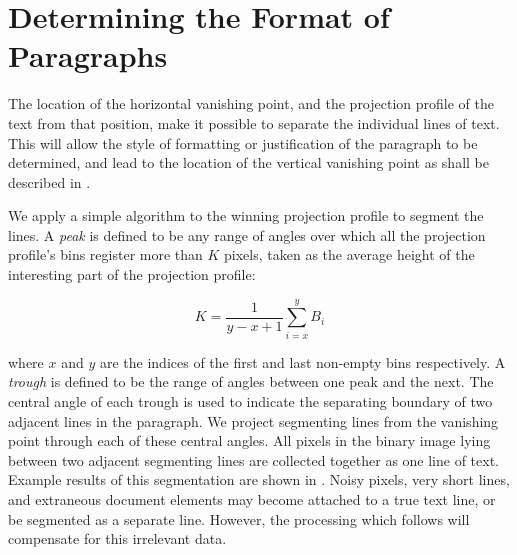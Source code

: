 

\section{Determining the Format  of Paragraphs} \label{sec-parags}

The location of the horizontal vanishing point, and the projection profile of
the text from that position, make it possible to separate the individual lines
of text.  This will allow the style of formatting or justification of the
paragraph to be determined, and lead to the location of the vertical vanishing
point as shall be described in .

We apply a simple algorithm to the winning projection profile to segment the
lines.  A {\em peak} is defined to be any range of angles over which all the
projection profile's bins register more than $K$ pixels, taken as the average
height of the interesting part of the projection profile:

\begin{equation}
K= \frac{1}{y-x+1} \sum_{i=x}^{y}B_i
\end{equation}

{\parindent 0mm
where $x$ and $y$ are the indices of the first and last non-empty bins respectively.
A {\em trough} is defined to be the range of angles between one peak and the next.  
The central angle of each trough is used to indicate the separating boundary of
two adjacent lines in the paragraph.  We project segmenting lines from the
vanishing point through each of these central angles.
All pixels in the binary image lying between two adjacent segmenting
lines are collected together as one line of text. Example results of this
segmentation are shown in .
Noisy pixels, very short lines, and extraneous document
elements may become attached to a true text line, or be segmented as a separate
line.  However, the processing which follows will compensate for this irrelevant
data. 
} 


